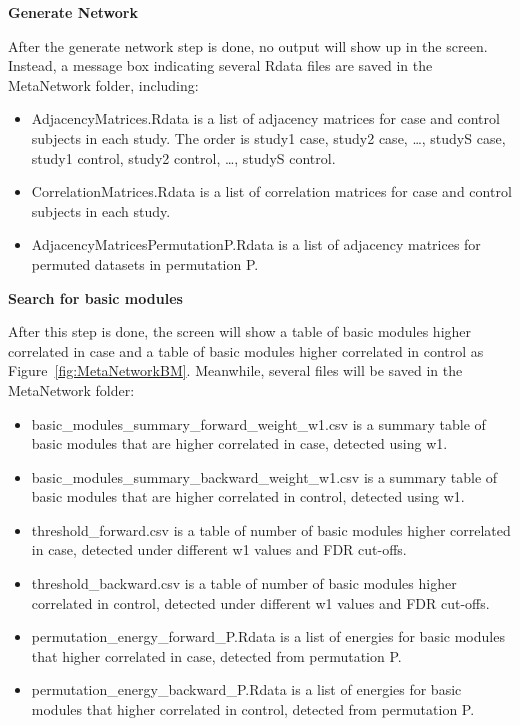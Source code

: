 \textbf{Generate Network}

After the generate network step is done, no output will show up in the screen. Instead, a message box indicating several Rdata files are saved in the MetaNetwork folder, including:

\begin{itemize}
\item AdjacencyMatrices.Rdata is a list of adjacency matrices for case and control subjects in each study. The order is study1 case, study2 case, \dots, studyS case, study1 control, study2 control, \dots, studyS control.
\item CorrelationMatrices.Rdata is a list of correlation matrices for case and control subjects in each study.
\item AdjacencyMatricesPermutationP.Rdata is a list of adjacency matrices for permuted datasets in permutation P.
\end{itemize}

\textbf{Search for basic modules}

After this step is done, the screen will show a table of basic modules higher correlated in case and a table of basic modules higher correlated in control as Figure~\ref{fig:MetaNetworkBM}. Meanwhile, several files will be saved in the MetaNetwork folder:

\begin{itemize}
 \item basic\_modules\_summary\_forward\_weight\_w1.csv is a summary table of basic modules that are higher correlated in case, detected using w1.
 \item basic\_modules\_summary\_backward\_weight\_w1.csv is a summary table of basic modules that are higher correlated in control, detected using w1.
\item threshold\_forward.csv is a table of number of basic modules higher correlated in case, detected under different w1 values and FDR cut-offs.
\item threshold\_backward.csv is a table of number of basic modules higher correlated in control, detected under different w1 values and FDR cut-offs.
 \item permutation\_energy\_forward\_P.Rdata is a list of energies for basic modules that higher correlated in case, detected from permutation P.
  \item permutation\_energy\_backward\_P.Rdata is a list of energies for basic modules that higher correlated in control, detected from permutation P.
\end{itemize}


